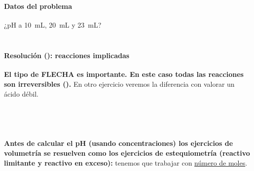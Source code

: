 
\begin{frame}
	\frametitle{\ejerciciocmd}
	\framesubtitle{Datos del problema}
	\begin{center}
		{\huge ¿$\mathrm{pH}$ a \SI{10}{\milli\liter}, \SI{20}{\milli\liter} y \SI{23}{\milli\liter}?}\\[.3cm]
		\\[.3cm]
	\end{center}
\end{frame}

\begin{frame}
	\frametitle{\ejerciciocmd}
	\framesubtitle{Resolución (): reacciones implicadas}
	\alert{\textbf{El tipo de FLECHA es importante. En este caso todas las reacciones son irreversibles (\ce{->}).}} En otro ejercicio veremos la diferencia con valorar un ácido débil.
	\\
	\begin{center}
	\end{center}
	\\
	\begin{center}
	\end{center}
	\\
	\begin{center}
	\end{center}
	\alert{\textbf{Antes de calcular el pH (usando concentraciones) los ejercicios de volumetría se resuelven como los ejercicios de estequiometría (reactivo limitante y reactivo en exceso):}} tenemos que trabajar con \underline{número de moles}.
\end{frame}

